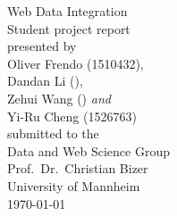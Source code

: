 \documentclass[11pt,titlepage,oneside,openany]{article}
\begin{document}
\begin{titlepage}
	\vspace*{2cm}
  \begin{center}
   {\Large Web Data Integration\\}
   \vspace{2cm} 
   {Student project report\\}
   \vspace{2cm}
   {presented by\\
    Oliver Frendo (1510432), \\
    Dandan Li (),\\
    Zehui Wang () \textit{and} \\
	Yi-Ru Cheng (1526763) \\
   }
   \vspace{1cm} 
   {submitted to the\\
    Data and Web Science Group\\
    Prof.\ Dr.\ Christian Bizer\\
    University of Mannheim\\} \vspace{2cm}
   {\today}
  \end{center}
\end{titlepage} 

\tableofcontents
\newpage


\listoffigures

\listoftables


\newpage








\newpage






\newpage


\pagestyle{empty}
\end{document}
